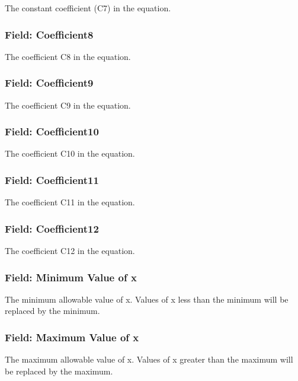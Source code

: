 The constant coefficient (C7) in the equation.

\subsubsection{Field: Coefficient8}\label{field-coefficient8}

The coefficient C8 in the equation.

\subsubsection{Field: Coefficient9}\label{field-coefficient9}

The coefficient C9 in the equation.

\subsubsection{Field: Coefficient10}\label{field-coefficient10}

The coefficient C10 in the equation.

\subsubsection{Field: Coefficient11}\label{field-coefficient11}

The coefficient C11 in the equation.

\subsubsection{Field: Coefficient12}\label{field-coefficient12}

The coefficient C12 in the equation.

\subsubsection{Field: Minimum Value of x}\label{field-minimum-value-of-x-9}

The minimum allowable value of x. Values of x less than the minimum will be replaced by the minimum.

\subsubsection{Field: Maximum Value of x}\label{field-maximum-value-of-x-10}

The maximum allowable value of x. Values of x greater than the maximum will be replaced by the maximum.

